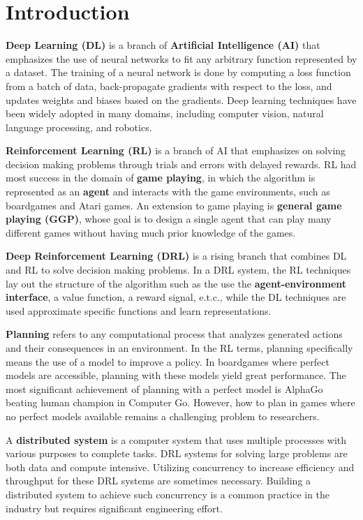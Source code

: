 \chapter{Introduction} \label{sec:intro}

\textbf{Deep Learning (DL)} is a branch of \textbf{Artificial Intelligence (AI)} that emphasizes the use of neural networks to fit any arbitrary function represented by a dataset.
The training of a neural network is done by computing a loss function from a batch of data, back-propagate gradients with respect to the loss, and updates weights and biases based on the gradients.
Deep learning techniques have been widely adopted in many domains, including computer vision, natural language processing, and robotics.

\textbf{Reinforcement Learning (RL)} is a branch of AI that emphasizes on solving decision making problems through trials and errors with delayed rewards.
RL had most success in the domain of \textbf{game playing}, in which the algorithm is represented as an \textbf{agent} and interacts with the game environments, such as boardgames and Atari games.
An extension to game playing is \textbf{general game playing (GGP)}, whose goal is to design a single agent that can play many different games without having much prior knowledge of the games.

\textbf{Deep Reinforcement Learning (DRL)} is a rising branch that combines DL and RL to solve decision making problems.
In a DRL system, the RL techniques lay out the structure of the algorithm such as the use the \textbf{agent-environment interface}, a value function, a reward signal, e.t.c., while the DL techniques are used approximate specific functions and learn representations.

\textbf{Planning} refers to any computational process that analyzes generated actions and their consequences in an environment.
In the RL terms, planning specifically means the use of a model to improve a policy.
In boardgames where perfect models are accessible, planning with these models yield great performance.
The most significant achievement of planning with a perfect model is AlphaGo beating human champion in Computer Go.
However, how to plan in games where no perfect models available remains a challenging problem to researchers.

A \textbf{distributed system} is a computer system that uses multiple processes with various purposes to complete tasks.
DRL systems for solving large problems are both data and compute intensive.
Utilizing concurrency to increase efficiency and throughput for these DRL systems are sometimes necessary.
Building a distributed system to achieve such concurrency is a common practice in the industry but requires significant engineering effort.

